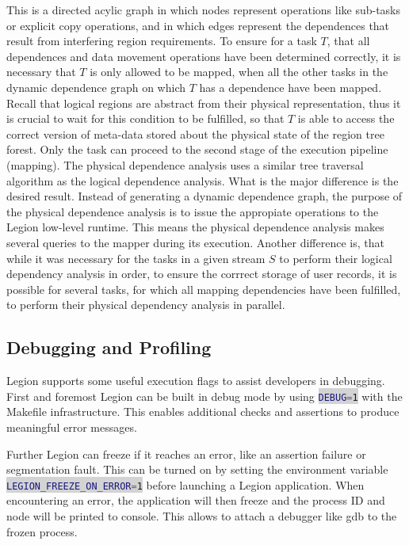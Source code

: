 \documentclass{article}      %
\newcommand{\inlinecode}[2]{\colorbox{lightgray}{\lstinline[language=#1]$#2$}}
\begin{document}
This is a directed acylic graph in which nodes represent operations like sub-tasks or explicit copy operations, and in which edges represent the dependences that result from interfering region requirements. To ensure for a task $T$, that all dependences and data movement operations have been determined correctly, it is necessary that $T$ is only allowed to be mapped, when all the other tasks in the dynamic dependence graph on which $T$ has a dependence have been mapped. Recall that logical regions are abstract from their physical representation, thus it is crucial to wait for this condition to be fulfilled, so that $T$ is able to access the correct version of meta-data stored about the physical state of the region tree forest. Only the task can proceed to the second stage of the execution pipeline (mapping). The physical dependence analysis uses a similar tree traversal algorithm as the logical dependence analysis. What is the major difference is the desired result. Instead of generating a dynamic dependence graph, the purpose of the physical dependence analysis is to issue the appropiate operations to the Legion low-level runtime. This means the physical dependence analysis makes several queries to the mapper during its execution. Another difference is, that while it was necessary for the tasks in a given stream $S$ to perform their logical dependency analysis in order, to ensure the corrrect storage of user records, it is possible for several tasks, for which all mapping dependencies have been fulfilled, to perform their physical dependency analysis in parallel.

\subsection{Debugging and Profiling}\label{sec:profDebug}
Legion supports some useful execution flags to assist developers in debugging. First and foremost Legion can be built in debug mode by using \inlinecode{Bash}{DEBUG=1} with the Makefile infrastructure. This enables additional checks and assertions to produce meaningful error messages.

Further Legion can freeze if it reaches an error, like an assertion failure or segmentation fault. This can be turned on by setting the environment variable \inlinecode{Bash}{LEGION_FREEZE_ON_ERROR=1} before launching a Legion application. When encountering an error, the application will then freeze and the process ID and node will be printed to console. This allows to attach a debugger like gdb to the frozen process.
\end{document}
